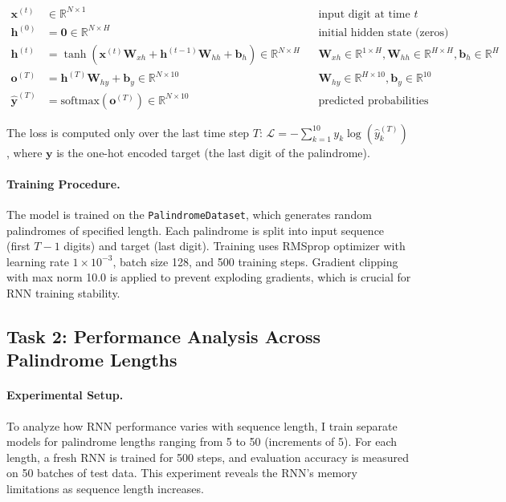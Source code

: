\documentclass[11pt,a4paper]{article}
\begin{document}
\begin{align*}
\mathbf{x}^{(t)} &\in \mathbb{R}^{N \times 1} && \text{input digit at time } t \\
\mathbf{h}^{(0)} &= \mathbf{0} \in \mathbb{R}^{N \times H} && \text{initial hidden state (zeros)} \\
\mathbf{h}^{(t)} &= \tanh(\mathbf{x}^{(t)} \mathbf{W}_{xh} + \mathbf{h}^{(t-1)} \mathbf{W}_{hh} + \mathbf{b}_h) \in \mathbb{R}^{N \times H} && \mathbf{W}_{xh} \in \mathbb{R}^{1 \times H}, \mathbf{W}_{hh} \in \mathbb{R}^{H \times H}, \mathbf{b}_h \in \mathbb{R}^{H} \\
\mathbf{o}^{(T)} &= \mathbf{h}^{(T)} \mathbf{W}_{hy} + \mathbf{b}_y \in \mathbb{R}^{N \times 10} && \mathbf{W}_{hy} \in \mathbb{R}^{H \times 10}, \mathbf{b}_y \in \mathbb{R}^{10} \\
\hat{\mathbf{y}}^{(T)} &= \text{softmax}(\mathbf{o}^{(T)}) \in \mathbb{R}^{N \times 10} && \text{predicted probabilities}
\end{align*}

The loss is computed only over the last time step $T$: $\mathcal{L} = -\sum_{k=1}^{10} y_k \log(\hat{y}_k^{(T)})$, where $\mathbf{y}$ is the one-hot encoded target (the last digit of the palindrome).

\paragraph{Training Procedure.} The model is trained on the \texttt{PalindromeDataset}, which generates random palindromes of specified length. Each palindrome is split into input sequence (first $T-1$ digits) and target (last digit). Training uses RMSprop optimizer with learning rate $1 \times 10^{-3}$, batch size 128, and 500 training steps. Gradient clipping with max norm 10.0 is applied to prevent exploding gradients, which is crucial for RNN training stability.

\subsection{Task 2: Performance Analysis Across Palindrome Lengths}
\paragraph{Experimental Setup.} To analyze how RNN performance varies with sequence length, I train separate models for palindrome lengths ranging from 5 to 50 (increments of 5). For each length, a fresh RNN is trained for 500 steps, and evaluation accuracy is measured on 50 batches of test data. This experiment reveals the RNN's memory limitations as sequence length increases.
\end{document}
